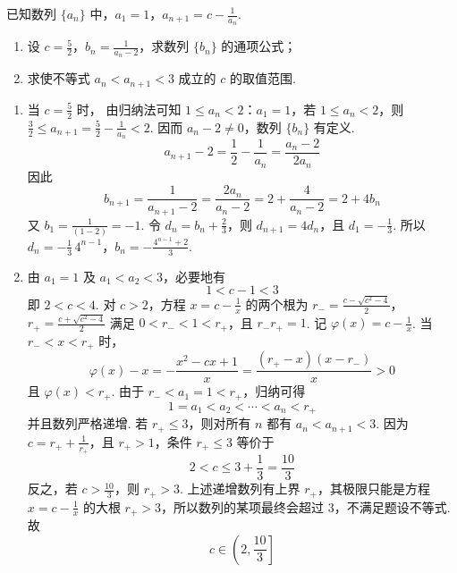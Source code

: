 \begin{problem}
已知数列 \(\{a_{n}\}\) 中，\(a_1 = 1\)，\(a_{n+1} = c - \frac{1}{a_n}\).
\begin{enumerate}
\item 设 \(c = \frac{5}{2}\)，\(b_n = \frac{1}{a_n - 2}\)，求数列 \(\{b_n\}\) 的通项公式；
\item 求使不等式 \(a_{n} < a_{n+1} < 3\) 成立的 \(c\) 的取值范围.
\end{enumerate}
\end{problem}

\begin{solution}
\begin{enumerate}
\item 当 \(c=\frac{5}{2}\) 时，
由归纳法可知 \(1\leqslant a_n<2\)：\(a_1=1\)，若 \(1\leqslant a_n<2\)，则
\(\frac{3}{2}\leqslant a_{n+1}=\frac{5}{2}-\frac{1}{a_n}<2\). 因而 \(a_n-2\ne0\)，数列 \(\{b_n\}\) 有定义.
\[
a_{n+1}-2=\frac12-\frac1{a_n}=\frac{a_n-2}{2a_n}
\]
因此
\[
b_{n+1}=\frac1{a_{n+1}-2}
=\frac{2a_n}{a_n-2}
=2+\frac4{a_n-2}=2+4b_n
\]
又 \(b_1=\frac{1}{(1-2)}=-1\). 令 \(d_n=b_n+\frac{2}{3}\)，则
\(d_{n+1}=4d_n\)，且 \(d_1=-\frac{1}{3}\). 所以
\(d_n=-\frac13\,4^{n-1}\)，\(b_n=-\frac{4^{n-1}+2}{3}\).
\item 由 \(a_1=1\) 及 \(a_1<a_2<3\)，必要地有
\[
1<c-1<3
\]
即 \(2<c<4\). 对 \(c>2\)，方程
\(x=c-\frac{1}{x}\) 的两个根为
\(r_{-}=\frac{c-\sqrt{c^{2}-4}}2\)，\(r_{+}=\frac{c+\sqrt{c^{2}-4}}2\)
满足 \(0<r_{-}<1<r_{+}\)，且 \(r_{-}r_{+}=1\). 记
\(\varphi(x)=c-\frac{1}{x}\). 当 \(r_{-}<x<r_{+}\) 时，
\[
\varphi(x)-x
=-\frac{x^{2}-cx+1}{x}
=\frac{(r_{+}-x)(x-r_{-})}{x}>0
\]
且 \(\varphi(x)<r_{+}\). 由于 \(r_{-}<a_1=1<r_{+}\)，归纳可得
\[
1=a_1<a_2<\cdots<a_n<r_{+}
\]
并且数列严格递增. 若 \(r_{+}\leqslant3\)，则对所有 \(n\) 都有
\(a_n<a_{n+1}<3\). 因为 \(c=r_{+}+\frac{1}{r_{+}}\)，且 \(r_{+}>1\)，条件
\(r_{+}\leqslant3\) 等价于
\[
2<c\leqslant3+\frac13=\frac{10}{3}
\]
反之，若 \(c>\frac{10}{3}\)，则 \(r_{+}>3\). 上述递增数列有上界 \(r_{+}\)，其极限只能是方程
\(x=c-\frac{1}{x}\) 的大根 \(r_{+}>3\)，所以数列的某项最终会超过 \(3\)，不满足题设不等式. 故
\[
c\in\left(2,\frac{10}{3}\right]
\]
\end{enumerate}
\end{solution}
